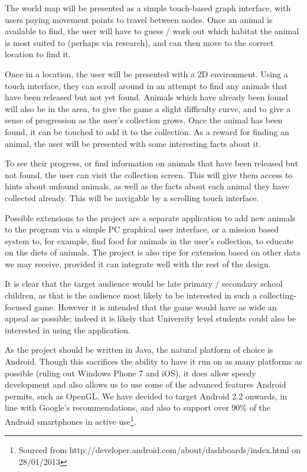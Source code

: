 \documentclass[]{report}
\begin{document}
The world map will be presented as a simple touch-based graph interface, with users paying movement points to travel between nodes. Once an animal is available to find, the user will have to guess / work out which habitat the animal is most suited to (perhaps via research), and can then move to the correct location to find it.

Once in a location, the user will be presented with a 2D environment. Using a touch interface, they can scroll around in an attempt to find any animals that have been released but not yet found. Animals which have already been found will also be in the area, to give the game a slight difficulty curve, and to give a sense of progression as the user's collection grows. Once the animal has been found, it can be touched to add it to the collection. As a reward for finding an animal, the user will be presented with some interesting facts about it.

To see their progress, or find information on animals that have been released but not found, the user can visit the collection screen. This will give them access to hints about unfound animals, as well as the facts about each animal they have collected already. This will be navigable by a scrolling touch interface.

Possible extensions to the project are a separate application to add new animals to the program via a simple PC graphical user interface, or a mission based system to, for example, find food for animals in the user's collection, to educate on the diets of animals. The project is also ripe for extension based on other data we may receive, provided it can integrate well with the rest of the design.

It is clear that the target audience would be late primary / secondary school children, as that is the audience most likely to be interested in such a collecting-focused game. However it is intended that the game would have as wide an appeal as possible; indeed it is likely that University level students could also be interested in using the application.

As the project should be written in Java, the natural platform of choice is Android. Though this sacrifices the ability to have it run on as many platforms as possible (ruling out Windows Phone 7 and iOS), it does allow speedy development and also allows us to use some of the advanced features Android permits, such as OpenGL. We have decided to target Android 2.2 onwards, in line with Google's recommendations, and also to support over 90\% of the Android smartphones in active use\footnote{Sourced from http://developer.android.com/about/dashboards/index.html on 28/01/2013}.
\end{document}

